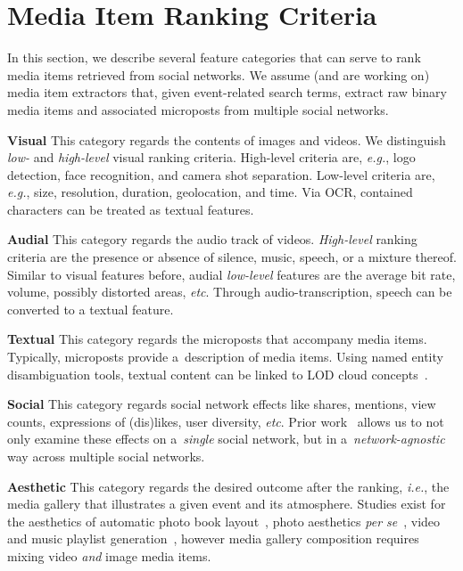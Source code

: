 \documentclass{article}
\let\oldsection\section
\renewcommand{\section}[1]{\oldsection{#1}\vspace{-0.95em}}
\begin{document}
\vspace{-0.95em}
\section{Media Item Ranking Criteria}
In this section, we describe several feature categories that can serve to rank
media items retrieved from social networks. 
We assume (and are working on) media item extractors that,
given event-related search terms,
extract raw binary media items and associated microposts
from multiple social networks.

\noindent \textbf{Visual}
This category regards the contents of images and videos.
We distinguish \emph{low-} and \emph{high-level} visual ranking criteria.
High-level criteria are, \emph{e.g.}, logo detection,
face recognition, and camera shot separation.
Low-level criteria are, \emph{e.g.}, size, resolution,
duration, geolocation, and time.
Via OCR, contained characters can be treated as textual features.

\noindent \textbf{Audial}
This category regards the audio track of videos.
\emph{High-level} ranking criteria are the presence or absence
of silence, music, speech, or a mixture thereof.
Similar to visual features before,
audial \emph{low-level} features are the average bit rate,
volume, possibly distorted areas, \emph{etc}.
Through audio-transcription, speech can be converted to a textual feature.

\noindent \textbf{Textual}
This category regards the microposts that accompany media items.
Typically, microposts provide a~description of media items.
Using named entity disambiguation tools,
textual content can be linked to LOD cloud concepts~\cite{Facebook2011}.

\noindent \textbf{Social}
This category regards social network effects like shares, mentions,
view counts, expressions of (dis)likes, user diversity, \emph{etc}.
Prior work~\cite{RAMSS2012} allows us to not only examine these effects
on a~\emph{single} social network,
but in a~\emph{network-agnostic} way across multiple social networks.

\noindent \textbf{Aesthetic}
This category regards the desired outcome after the ranking, \emph{i.e.},
the media gallery that illustrates a given event and its atmosphere.
Studies exist for the aesthetics of
automatic photo book layout~\cite{Photo2011},
photo aesthetics \emph{per se}~\cite{Photo2012},
video and music playlist generation~\cite{YouTube2010,Playlist2006},
however media gallery composition requires mixing video
\emph{and} image media items.
\end{document}
